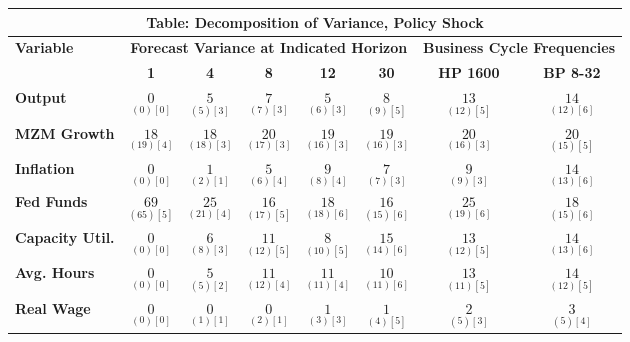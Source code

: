 \documentclass{article}
\begin{document}
 \begin{tabular}{|l|c|@{}c|c|@{}c|c|@{}c|c|} 
 \hline 
 \multicolumn{8}{|c|}{\textbf{Table: Decomposition of Variance, Policy Shock}} \\ \hline 
 \textbf{Variable} & \multicolumn{5}{|c}{\textbf{Forecast Variance at 
 Indicated Horizon}} & \multicolumn{2}{|c|}{\textbf{Business Cycle 
 Frequencies}} \\ \cline{2-8} 
 & \textbf{1} & \textbf{4} & \textbf{8} & \textbf{12} & \textbf{30} & \textbf{%
 HP 1600} & \textbf{BP 8-32} \\ \hline\hline 
 \textbf{Output} & $\underset{(  0) [  0]}{  0}$ & $\underset{(  5) [  3]}{  5}$ & $\underset{(  7) [  3]}{  7}$ & $\underset{(  6) [  3]}{  5}$ & $\underset{(  9) [  5]}{  8}$ & $\underset{( 12) [  5]}{ 13}$ & $\underset{( 12) [  6]}{ 14}$ \\ \hline 
 \textbf{MZM Growth} & $\underset{( 19) [  4]}{ 18}$ & $\underset{( 18) [  3]}{ 18}$ & $\underset{( 17) [  3]}{ 20}$ & $\underset{( 16) [  3]}{ 19}$ & $\underset{( 16) [  3]}{ 19}$ & $\underset{( 16) [  3]}{ 20}$ & $\underset{( 15) [  5]}{ 20}$ \\ \hline 
 \textbf{Inflation} & $\underset{(  0) [  0]}{  0}$ & $\underset{(  2) [  1]}{  1}$ & $\underset{(  6) [  4]}{  5}$ & $\underset{(  8) [  4]}{  9}$ & $\underset{(  7) [  3]}{  7}$ & $\underset{(  9) [  3]}{  9}$ & $\underset{( 13) [  6]}{ 14}$ \\ \hline 
 \textbf{Fed Funds} & $\underset{( 65) [  5]}{ 69}$ & $\underset{( 21) [  4]}{ 25}$ & $\underset{( 17) [  5]}{ 16}$ & $\underset{( 18) [  6]}{ 18}$ & $\underset{( 15) [  6]}{ 16}$ & $\underset{( 19) [  6]}{ 25}$ & $\underset{( 15) [  6]}{ 18}$ \\ \hline 
 \textbf{Capacity Util.} & $\underset{(  0) [  0]}{  0}$ & $\underset{(  8) [  3]}{  6}$ & $\underset{( 12) [  5]}{ 11}$ & $\underset{( 10) [  5]}{  8}$ & $\underset{( 14) [  6]}{ 15}$ & $\underset{( 12) [  5]}{ 13}$ & $\underset{( 13) [  6]}{ 14}$ \\ \hline 
 \textbf{Avg. Hours} & $\underset{(  0) [  0]}{  0}$ & $\underset{(  5) [  2]}{  5}$ & $\underset{( 12) [  4]}{ 11}$ & $\underset{( 11) [  4]}{ 11}$ & $\underset{( 11) [  6]}{ 10}$ & $\underset{( 11) [  5]}{ 13}$ & $\underset{( 12) [  5]}{ 14}$ \\ \hline 
 \textbf{Real Wage} &  $\underset{(  0) [  0]}{  0}$ & $\underset{(  1) [  1]}{  0}$ & $\underset{(  2) [  1]}{  0}$ & $\underset{(  3) [  3]}{  1}$ & $\underset{(  4) [  5]}{  1}$ & $\underset{(  5) [  3]}{  2}$ & $\underset{(  5) [  4]}{  3}$ \\ \hline 

\end{tabular}
\end{document}
